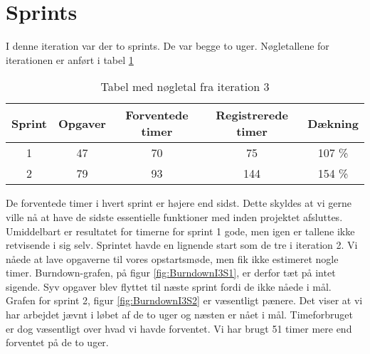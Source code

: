 \section{Sprints}

I denne iteration var der to sprints. De var begge to uger.
Nøgletallene for iterationen er anført i tabel \ref{table:iteration3sprints}

\begin{table}
\centering
\begin{tabular}{|c|c|c|c|c|}
\hline 
\textbf{Sprint} 	& \textbf{Opgaver} 	& \textbf{Forventede timer} 	& \textbf{Registrerede timer} 	& \textbf{Dækning} \\ 
\hline
1 		& 47 		& 70 				& 75						& 107 \% \\ 
\hline 
2 		& 79 		& 93 				& 144					&  154 \% \\ 
\hline 
\end{tabular}
\caption{Tabel med nøgletal fra iteration 3}
\label{table:iteration3sprints}
\end{table}

De forventede timer i hvert sprint er højere end sidst. Dette skyldes at vi gerne ville nå at have de sidste essentielle funktioner med inden projektet afsluttes. Umiddelbart er resultatet for timerne for sprint 1 gode, men igen er tallene ikke retvisende i sig selv. Sprintet havde en lignende start som de tre i iteration 2. Vi nåede at lave opgaverne til vores opstartsmøde, men fik ikke estimeret nogle timer. Burndown-grafen, på figur \ref{fig:BurndownI3S1}, er derfor tæt på intet sigende. Syv opgaver blev flyttet til næste sprint fordi de ikke nåede i mål. Grafen for sprint 2, figur \ref{fig:BurndownI3S2} er væsentligt pænere. Det viser at vi har arbejdet jævnt i løbet af de to uger og næsten er nået i mål. Timeforbruget er dog væsentligt over hvad vi havde forventet. Vi har brugt 51 timer mere end forventet på de to uger.

\begin{minipage}{0.5\textwidth}
\end{minipage}
\begin{minipage}{0.5\textwidth}
\end{minipage}
